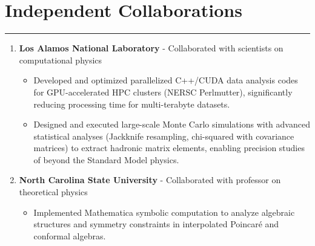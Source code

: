 \documentclass[11pt]{article}
\begin{document}
\section*{Independent Collaborations}
\hrule
\vspace{-0.3em}
\begin{enumerate}
    \item \textbf{Los Alamos National Laboratory} - Collaborated with scientists on computational physics
    \vspace{-0.7em}
\begin{itemize}
    \item Developed and optimized parallelized C++/CUDA data analysis codes for GPU-accelerated HPC clusters (NERSC Perlmutter), significantly reducing processing time for multi-terabyte datasets.
    \vspace{-0.5em}
    \item Designed and executed large-scale Monte Carlo simulations with advanced statistical analyses (Jackknife resampling, chi-squared with covariance matrices) to extract hadronic matrix elements, enabling precision studies of beyond the Standard Model physics.
\end{itemize}

\item  \textbf{North Carolina State University} - Collaborated with professor on theoretical physics
\vspace{-0.5em}
\begin{itemize}
    \item Implemented Mathematica symbolic computation to analyze algebraic structures and symmetry constraints in interpolated Poincaré and conformal algebras.
\end{itemize}

\end{enumerate}

\vspace{0.5em}
\end{document}

